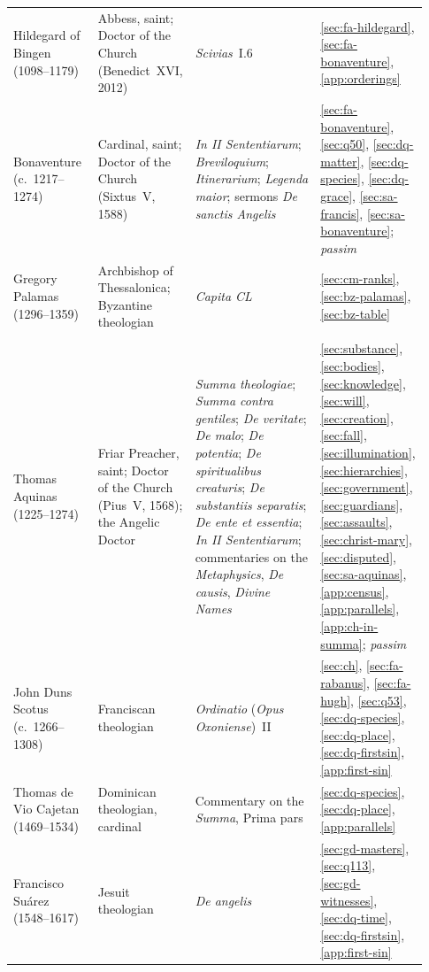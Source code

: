 \begin{longtable}{@{}>{\raggedright\arraybackslash}p{0.21\linewidth}>{\raggedright\arraybackslash}p{0.20\linewidth}>{\raggedright\arraybackslash}p{0.35\linewidth}>{\raggedright\arraybackslash}p{0.17\linewidth}@{}}
Hildegard of Bingen (1098--1179) & Abbess, saint; Doctor of the Church (Benedict~XVI, 2012) & \emph{Scivias}~I.6 & \ref{sec:fa-hildegard}, \ref{sec:fa-bonaventure}, \ref{app:orderings}\\
Bonaventure (c.~1217--1274) & Cardinal, saint; Doctor of the Church (Sixtus~V, 1588) & \emph{In II Sententiarum}; \emph{Breviloquium}; \emph{Itinerarium}; \emph{Legenda maior}; sermons \emph{De sanctis Angelis} & \ref{sec:fa-bonaventure}, \ref{sec:q50}, \ref{sec:dq-matter}, \ref{sec:dq-species}, \ref{sec:dq-grace}, \ref{sec:sa-francis}, \ref{sec:sa-bonaventure}; \emph{passim}\\
Gregory Palamas (1296--1359) & Archbishop of Thessalonica; Byzantine theologian & \emph{Capita CL} & \ref{sec:cm-ranks}, \ref{sec:bz-palamas}, \ref{sec:bz-table}\\
\addlinespace[4pt]
\multicolumn{4}{@{}l}{\textbf{Thomas Aquinas and the scholastics after him}}\\*
\addlinespace[2pt]
Thomas Aquinas (1225--1274) & Friar Preacher, saint; Doctor of the Church (Pius~V, 1568); the Angelic Doctor & \emph{Summa theologiae}; \emph{Summa contra gentiles}; \emph{De veritate}; \emph{De malo}; \emph{De potentia}; \emph{De spiritualibus creaturis}; \emph{De substantiis separatis}; \emph{De ente et essentia}; \emph{In II Sententiarum}; commentaries on the \emph{Metaphysics}, \emph{De causis}, \emph{Divine Names} & \ref{sec:substance}, \ref{sec:bodies}, \ref{sec:knowledge}, \ref{sec:will}, \ref{sec:creation}, \ref{sec:fall}, \ref{sec:illumination}, \ref{sec:hierarchies}, \ref{sec:government}, \ref{sec:guardians}, \ref{sec:assaults}, \ref{sec:christ-mary}, \ref{sec:disputed}, \ref{sec:sa-aquinas}, \ref{app:census}, \ref{app:parallels}, \ref{app:ch-in-summa}; \emph{passim}\\
John Duns Scotus (c.~1266--1308) & Franciscan theologian & \emph{Ordinatio} (\emph{Opus Oxoniense})~II & \ref{sec:ch}, \ref{sec:fa-rabanus}, \ref{sec:fa-hugh}, \ref{sec:q53}, \ref{sec:dq-species}, \ref{sec:dq-place}, \ref{sec:dq-firstsin}, \ref{app:first-sin}\\
Thomas de Vio Cajetan (1469--1534) & Dominican theologian, cardinal & Commentary on the \emph{Summa}, Prima pars & \ref{sec:dq-species}, \ref{sec:dq-place}, \ref{app:parallels}\\
Francisco Su\'arez (1548--1617) & Jesuit theologian & \emph{De angelis} & \ref{sec:gd-masters}, \ref{sec:q113}, \ref{sec:gd-witnesses}, \ref{sec:dq-time}, \ref{sec:dq-firstsin}, \ref{app:first-sin}\\

\end{longtable}

